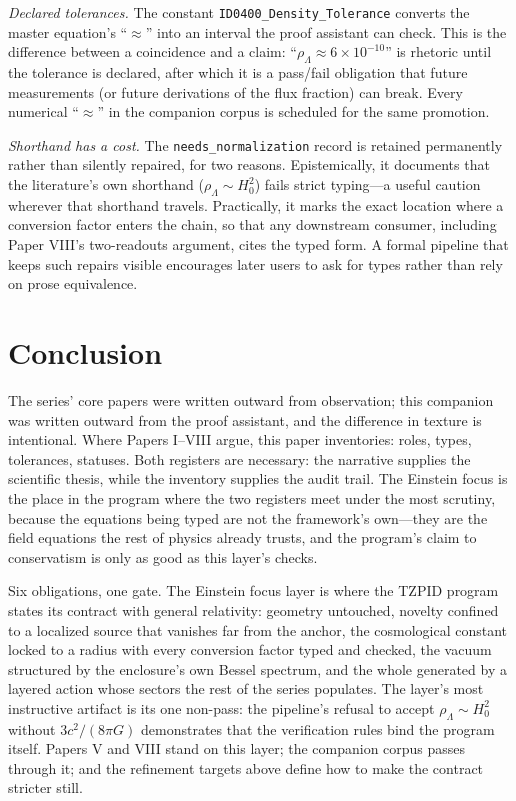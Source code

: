 \documentclass[11pt]{article}
\theoremstyle{remark}
\begin{document}
\emph{Declared tolerances.} The constant \texttt{ID0400\_Density\_Tolerance} converts the master equation's ``$\approx$'' into an interval the proof assistant can check. This is the difference between a coincidence and a claim: ``$\rho_\Lambda \approx 6 \times 10^{-10}$'' is rhetoric until the tolerance is declared, after which it is a pass/fail obligation that future measurements (or future derivations of the flux fraction) can break. Every numerical ``$\approx$'' in the companion corpus is scheduled for the same promotion.

\emph{Shorthand has a cost.} The \texttt{needs\_normalization} record is retained permanently rather than silently repaired, for two reasons. Epistemically, it documents that the literature's own shorthand ($\rho_\Lambda \sim H_0^2$) fails strict typing---a useful caution wherever that shorthand travels. Practically, it marks the exact location where a conversion factor enters the chain, so that any downstream consumer, including Paper VIII's two-readouts argument, cites the typed form. A formal pipeline that keeps such repairs visible encourages later users to ask for types rather than rely on prose equivalence.

\section{Conclusion}
\label{sec:conclusion}

The series' core papers were written outward from observation; this companion was written outward from the proof assistant, and the difference in texture is intentional. Where Papers I--VIII argue, this paper inventories: roles, types, tolerances, statuses. Both registers are necessary: the narrative supplies the scientific thesis, while the inventory supplies the audit trail. The Einstein focus is the place in the program where the two registers meet under the most scrutiny, because the equations being typed are not the framework's own---they are the field equations the rest of physics already trusts, and the program's claim to conservatism is only as good as this layer's checks.

Six obligations, one gate. The Einstein focus layer is where the TZPID program states its contract with general relativity: geometry untouched, novelty confined to a localized source that vanishes far from the anchor, the cosmological constant locked to a radius with every conversion factor typed and checked, the vacuum structured by the enclosure's own Bessel spectrum, and the whole generated by a layered action whose sectors the rest of the series populates. The layer's most instructive artifact is its one non-pass: the pipeline's refusal to accept $\rho_\Lambda \sim H_0^2$ without $3c^2/(8\pi G)$ demonstrates that the verification rules bind the program itself. Papers V and VIII stand on this layer; the companion corpus passes through it; and the refinement targets above define how to make the contract stricter still.
\end{document}

